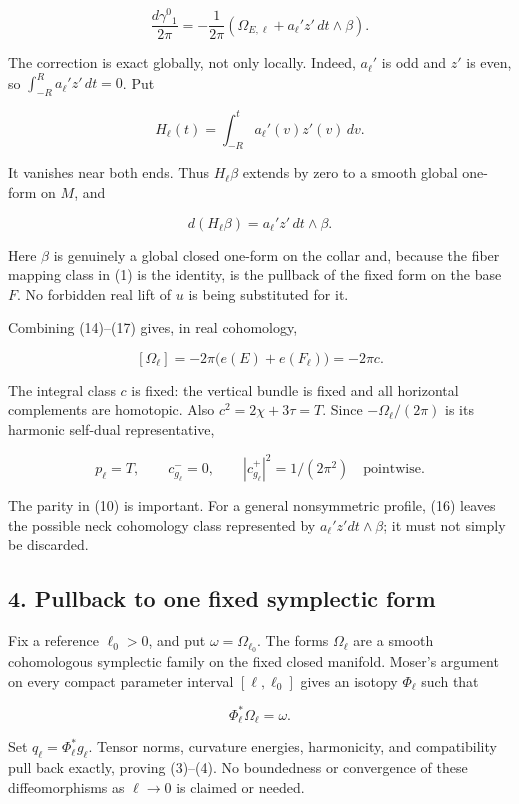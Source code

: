 \documentclass[
  11pt,
]{article}
\begin{document}
\[
 \frac{d\gamma^0{}_1}{2\pi}
 =-\frac1{2\pi}\left(\Omega_{E,\ell}
                  +a_\ell' z'\,dt\wedge\beta\right).
 \tag{16}
\]

The correction is exact globally, not only locally. Indeed, \(a_\ell'\)
is odd and \(z'\) is even, so \(\int_{-R}^{R}a_\ell' z'\,dt=0\). Put

\[
 H_\ell(t)=\int_{-R}^{t}a_\ell'(v)z'(v)\,dv.
\]

It vanishes near both ends. Thus \(H_\ell\beta\) extends by zero to a
smooth global one-form on \(M\), and

\[
 d(H_\ell\beta)=a_\ell' z'\,dt\wedge\beta.
 \tag{17}
\]

Here \(\beta\) is genuinely a global closed one-form on the collar and,
because the fiber mapping class in (1) is the identity, is the pullback
of the fixed form on the base \(F\). No forbidden real lift of \(u\) is
being substituted for it.

Combining (14)--(17) gives, in real cohomology,

\[
 \boxed{[\Omega_\ell]=-2\pi\bigl(e(E)+e(F_\ell)\bigr)=-2\pi c.}
 \tag{18}
\]

The integral class \(c\) is fixed: the vertical bundle is fixed and all
horizontal complements are homotopic. Also \(c^2=2\chi+3\tau=T\). Since
\(-\Omega_\ell/(2\pi)\) is its harmonic self-dual representative,

\[
 p_\ell=T,\qquad c_{g_\ell}^-=0,
 \qquad |c_{g_\ell}^+|^2=1/(2\pi^2)
 \quad\text{pointwise}.
 \tag{19}
\]

The parity in (10) is important. For a general nonsymmetric profile,
(16) leaves the possible neck cohomology class represented by
\(a_\ell'z' dt\wedge\beta\); it must not simply be discarded.

\hypertarget{pullback-to-one-fixed-symplectic-form}{%
\subsection{4. Pullback to one fixed symplectic
form}\label{pullback-to-one-fixed-symplectic-form}}

Fix a reference \(\ell_0>0\), and put \(\omega=\Omega_{\ell_0}\). The
forms \(\Omega_\ell\) are a smooth cohomologous symplectic family on the
fixed closed manifold. Moser's argument on every compact parameter
interval \([\ell,\ell_0]\) gives an isotopy \(\Phi_\ell\) such that

\[
 \Phi_\ell^*\Omega_\ell=\omega.
\]

Set \(q_\ell=\Phi_\ell^*g_\ell\). Tensor norms, curvature energies,
harmonicity, and compatibility pull back exactly, proving (3)--(4). No
boundedness or convergence of these diffeomorphisms as \(\ell\to0\) is
claimed or needed.
\end{document}
